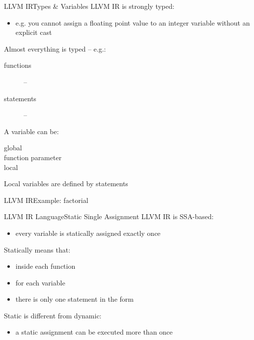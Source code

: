 \documentclass[10pt,mathserif]{beamer}
\begin{document}
\begin{frame}{LLVM IR}{Types \& Variables}
LLVM IR is \alert{strongly typed}:

\begin{itemize}
\item e.g. you cannot assign a floating point value to an integer variable
without an explicit cast
\end{itemize}

\alert{Almost everything} is \alert{typed} -- e.g.:

\begin{description}
\item[functions]  -- 
\item[statements]  -- 
\end{description}

A variable can be:

\begin{description}
\item[global] 
\item[function parameter] 
\item[local] 
\end{description}

Local variables are defined by statements
\end{frame}

\begin{frame}{LLVM IR}{Example: factorial}

\begin{center}
\end{center}
\end{frame}

\begin{frame}{LLVM IR Language}{Static Single Assignment}
LLVM IR is SSA-based:

\begin{itemize}
\item every variable is \alert{statically assigned} exactly \alert{once}
\end{itemize}

Statically means that:

\begin{itemize}
\item inside each function
\item for each variable 
\item there is only one statement in the form 
\end{itemize}

Static is different from dynamic:

\begin{itemize}
\item a static assignment can be executed more than once
\end{itemize}
\end{frame}
\end{document}
